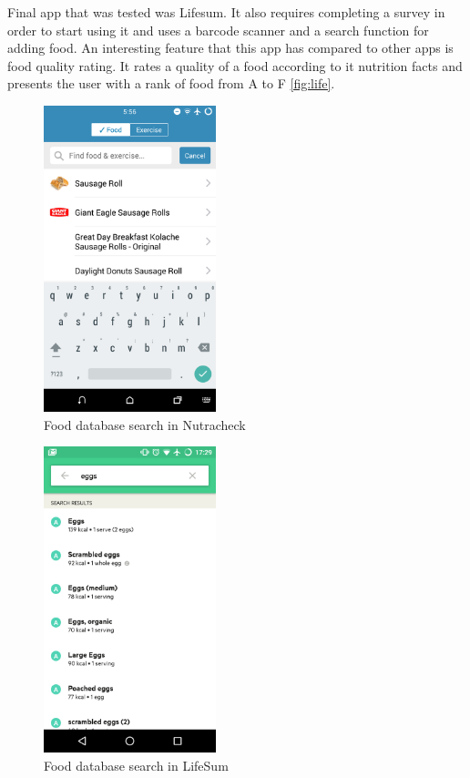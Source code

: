 Final app that was tested was Lifesum. It also requires completing a survey in order to start using it and uses a barcode scanner and a search function for adding food. An interesting feature that this app has compared to other apps is food quality rating. It rates a quality of a food according to it nutrition facts and presents the user with a rank of food from A to F \autoref{fig:life}.

 \begin{figure}[ht]
\centering
\includegraphics[width=5cm]{Figures/2/eat.png}
\caption{Food database search in Nutracheck}
\label{fig:eat}
\end{figure}

\begin{figure}[ht]
\centering
\includegraphics[width=5cm]{Figures/2/mm.png}
\caption{Food database search in LifeSum}
\label{fig:life}
\end{figure}


